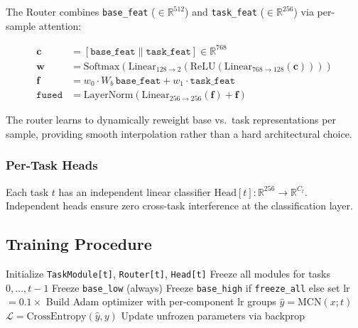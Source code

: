 \documentclass[10pt,twocolumn]{article}
\begin{document}
The Router combines \texttt{base\_feat} ($\in \mathbb{R}^{512}$) and \texttt{task\_feat} ($\in \mathbb{R}^{256}$) via per-sample attention:

\begin{align*}
\mathbf{c} &= [\texttt{base\_feat} \| \texttt{task\_feat}] \in \mathbb{R}^{768} \\
\mathbf{w} &= \text{Softmax}(\text{Linear}_{128\to2}(\text{ReLU}(\text{Linear}_{768\to128}(\mathbf{c})))) \\
\mathbf{f} &= w_0 \cdot W_b\,\texttt{base\_feat} + w_1 \cdot \texttt{task\_feat} \\
\texttt{fused} &= \text{LayerNorm}(\text{Linear}_{256\to256}(\mathbf{f}) + \mathbf{f})
\end{align*}

The router learns to dynamically reweight base vs.\ task representations per sample, providing smooth interpolation rather than a hard architectural choice.

\subsubsection{Per-Task Heads}

Each task $t$ has an independent linear classifier $\text{Head}[t]: \mathbb{R}^{256} \to \mathbb{R}^{C_t}$. Independent heads ensure zero cross-task interference at the classification layer.

\subsection{Training Procedure}

\begin{algorithm}[h]
\caption{MCN Training}
\label{alg:mcn}
\begin{algorithmic}[1]
    \STATE Initialize \texttt{TaskModule[t]}, \texttt{Router[t]}, \texttt{Head[t]}
    \STATE Freeze all modules for tasks $0, \ldots, t-1$
    \STATE Freeze \texttt{base\_low} (always)
    \STATE Freeze \texttt{base\_high} if \texttt{freeze\_all} else set lr $= 0.1\times$
    \STATE Build Adam optimizer with per-component lr groups
            \STATE $\hat{y} = \text{MCN}(x; t)$
            \STATE $\mathcal{L} = \text{CrossEntropy}(\hat{y}, y)$
            \STATE Update unfrozen parameters via backprop
        \ENDFOR
    \ENDFOR
\ENDFOR
\end{algorithmic}
\end{algorithm}
\end{document}
